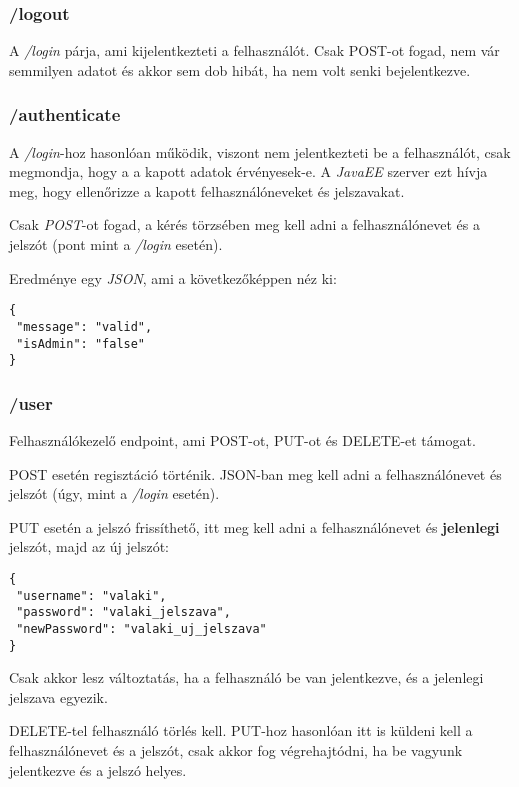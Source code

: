 \documentclass[]{article}
\begin{document}
\subsubsection{/logout}

A \textit{/login} párja, ami kijelentkezteti a felhasználót. Csak POST-ot fogad, nem vár semmilyen adatot és akkor sem dob hibát, ha nem volt senki bejelentkezve.

\subsubsection{/authenticate}

A \textit{/login}-hoz hasonlóan működik, viszont nem jelentkezteti be a felhasználót, csak megmondja, hogy a a kapott adatok 
érvényesek-e. A \textit{JavaEE} szerver ezt hívja meg, hogy ellenőrizze a kapott felhasználóneveket és jelszavakat.

Csak \textit{POST}-ot fogad, a kérés törzsében meg kell adni a felhasználónevet és a jelszót (pont mint a \textit{/login} esetén).

Eredménye egy \textit{JSON}, ami a következőképpen néz ki:

\bigskip
\begin{lstlisting}
{
 "message": "valid",
 "isAdmin": "false"
}
\end{lstlisting}

\subsubsection{/user}

Felhasználókezelő endpoint, ami POST-ot, PUT-ot és DELETE-et támogat.

POST esetén regisztáció történik. JSON-ban meg kell adni a felhasználónevet és jelszót (úgy, mint a \textit{/login} esetén).

PUT esetén a jelszó frissíthető, itt meg kell adni a felhasználónevet és \textbf{jelenlegi} jelszót, majd az új jelszót:

\bigskip
\begin{lstlisting}
{
 "username": "valaki",
 "password": "valaki_jelszava",
 "newPassword": "valaki_uj_jelszava"
}
\end{lstlisting}

Csak akkor lesz változtatás, ha a felhasználó be van jelentkezve, és a jelenlegi jelszava egyezik.

DELETE-tel felhasználó törlés kell. PUT-hoz hasonlóan itt is küldeni kell a felhasználónevet és a jelszót, csak akkor fog végrehajtódni, ha be vagyunk jelentkezve és a jelszó helyes.
\end{document}
